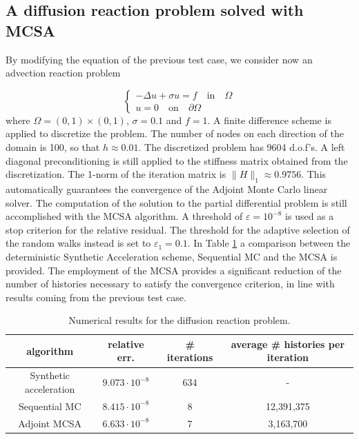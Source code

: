 \documentclass[a4paper,10pt]{article}
\begin{document}
\subsection{A diffusion reaction problem solved with MCSA}
By modifying the equation of the previous test case, we consider now 
an advection reaction problem

\begin{equation}
\begin{cases}
 -\Delta u +\sigma u= f \quad \text{in}\quad \Omega \\
 u=0\quad \text{on} \quad \partial\Omega
 \end{cases}
\end{equation}
where $\Omega=(0,1)\times (0,1)$, $\sigma=0.1$ and $f=1$. 
A finite difference scheme is applied to discretize the problem.
The number of nodes 
on each direction of the domain is 100, so that $h\approx 0.01$. The 
discretized problem has 9604 d.o.f's. A left 
diagonal preconditioning is still applied to 
the stiffness matrix obtained from the discretization. The 1-norm of the 
iteration matrix is $\lVert H\rVert_1\approx 0.9756$. This automatically 
guarantees the convergence of the Adjoint Monte Carlo linear solver. The 
computation of the solution to the partial differential problem is still 
accomplished with the MCSA algorithm. A threshold of $\varepsilon =10^{-8}$ is 
used as a stop criterion for the relative residual. The threshold 
for the adaptive selection of the random walks instead is set 
to $\varepsilon_1=0.1$.
In Table \ref{DR_results} a comparison between the deterministic Synthetic 
Acceleration 
scheme, Sequential MC and the MCSA is provided. 
The employment of the MCSA provides a significant reduction of the number of 
histories necessary to satisfy the convergence criterion, in line with results 
coming from the previous test case. 

\begin{table}[!h]
\centering
\hspace*{-0.8cm}
\begin{tabular}{|c|c|c|c|}
\hline
algorithm & relative err.& \# iterations & average \# histories per iteration\\
\hline
 Synthetic acceleration & $9.073\cdot 10^{-8}$ & 634 & - \\ 
\hline
 Sequential MC & $8.415 \cdot 10^{-8}$ &  8 & 12,391,375\\
 \hline
 Adjoint MCSA & $6.633 \cdot 10^{-8}$ &  7 & 3,163,700\\
\hline
\end{tabular}
\caption{Numerical results for the diffusion reaction problem.}
\label{DR_results}
\end{table}
\end{document}
